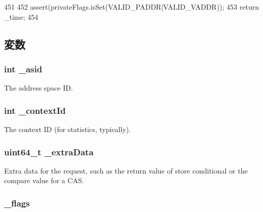 \begin{DoxyCode}
451     {
452         assert(privateFlags.isSet(VALID_PADDR|VALID_VADDR));
453         return _time;
454     }
\end{DoxyCode}


\subsection{変数}
\hypertarget{classRequest_ac24687367088700482ebb107b36c2c17}{
\subsubsection[{\_\-asid}]{\setlength{\rightskip}{0pt plus 5cm}int {\bf \_\-asid}}}
\label{classRequest_ac24687367088700482ebb107b36c2c17}
The address space ID. \hypertarget{classRequest_a4fea6f718ae601dc81fce73e88774682}{
\subsubsection[{\_\-contextId}]{\setlength{\rightskip}{0pt plus 5cm}int {\bf \_\-contextId}}}
\label{classRequest_a4fea6f718ae601dc81fce73e88774682}
The context ID (for statistics, typically). \hypertarget{classRequest_a51db05d8e83877867535a177e3b80fdd}{
\subsubsection[{\_\-extraData}]{\setlength{\rightskip}{0pt plus 5cm}uint64\_\-t {\bf \_\-extraData}}}
\label{classRequest_a51db05d8e83877867535a177e3b80fdd}
Extra data for the request, such as the return value of store conditional or the compare value for a CAS. \hypertarget{classRequest_af06d77fa987a3b16cc23de9ac834c43d}{
\subsubsection[{\_\-flags}]{ {\bf \_\-flags}}}
